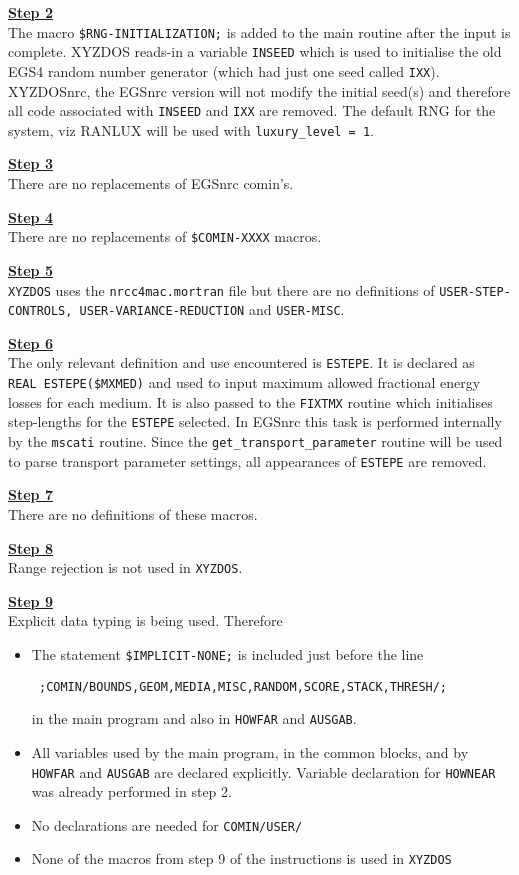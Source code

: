 \noindent
\underline{\bf Step 2} \hfill \\
The macro {\tt \$RNG-INITIALIZATION;} is added to the
main routine after the input is complete.
XYZDOS reads-in a variable
{\tt INSEED} which is used to initialise the old
EGS4 random number generator (which had just
one seed called {\tt IXX}). XYZDOSnrc, the EGSnrc version will not
modify the initial seed(s) and therefore all
code associated with {\tt INSEED} and {\tt IXX} are removed. The default
RNG for the system, viz RANLUX will be used with {\tt luxury\_level = 1}.


\noindent
\underline{\bf Step 3} \hfill \\
There are no replacements of EGSnrc comin's.

\noindent
\underline{\bf Step 4} \hfill \\
There are no replacements of {\tt \$COMIN-XXXX} macros.

\noindent
\underline{\bf Step 5} \hfill \\
{\tt XYZDOS} uses the {\tt nrcc4mac.mortran} file but there are
no definitions of {\tt USER-STEP-CONTROLS, USER-VARIANCE-REDUCTION} and
{\tt USER-MISC}.

\noindent
\underline{\bf Step 6} \hfill \\
The only relevant definition and use encountered is {\tt ESTEPE}.
It is declared as\\
{\tt REAL ESTEPE(\$MXMED)} and used to input
maximum allowed fractional energy losses for each medium.
It is also passed to the {\tt FIXTMX} routine which initialises
step-lengths for the {\tt ESTEPE} selected. In EGSnrc this task
is performed internally by the {\tt mscati} routine.
Since the {\tt get\_transport\_parameter} routine will be used
to parse transport parameter settings, all
appearances of {\tt ESTEPE} are removed.


\noindent
\underline{\bf Step 7} \hfill \\
There are no definitions of these macros.

\noindent
\underline{\bf Step 8} \hfill \\
Range rejection is not used in {\tt XYZDOS}.

\noindent
\underline{\bf Step 9} \hfill \\
Explicit data typing is being used. Therefore
\begin{itemize}
\item
The statement {\tt \$IMPLICIT-NONE;} is included just before the line
\begin{flushleft}{\tt
;COMIN/BOUNDS,GEOM,MEDIA,MISC,RANDOM,SCORE,STACK,THRESH/; }
\end{flushleft}
in the main program and also in {\tt HOWFAR} and {\tt AUSGAB}.
\item
All variables used by the main program, in
the common blocks, and by
{\tt HOWFAR} and {\tt AUSGAB} are declared explicitly. Variable declaration for
{\tt HOWNEAR} was already performed in step 2.
\item
No declarations are needed for {\tt COMIN/USER/}
\item
None of the macros from step 9 of the instructions is used in
{\tt XYZDOS}
\end{itemize}

